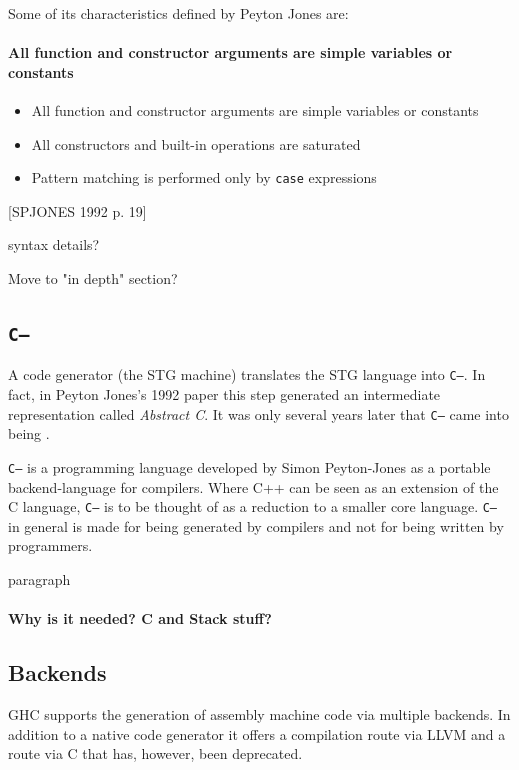 \documentclass[runningheads]{llncs}
\begin{document}
Some of its characteristics defined by Peyton Jones \cite{jones1992implementing} are:

\paragraph{All function and constructor arguments are simple variables or constants}
\begin{itemize}
	\item All function and constructor arguments are simple variables or constants
	\item All constructors and built-in operations are saturated
	\item Pattern matching is performed only by \texttt{case} expressions
\end{itemize}

[SPJONES 1992 p. 19]


syntax details?

Move to "in depth" section?

\subsection{\texttt{C--}}
\label{subsec:C--}

A code generator (the STG machine) translates the STG language into \texttt{C--}. In fact, in Peyton Jones's 1992 paper \cite{jones1992implementing} this step generated an intermediate representation called \textit{Abstract C}. It was only several years later that \texttt{C--} came into being \cite{jones1999c}.

\texttt{C--} is a programming language developed by Simon Peyton-Jones as a portable backend-language for compilers. Where C++ can be seen as an extension of the C language, \texttt{C--} is to be thought of as a reduction to a smaller core language. \texttt{C--} in general is made for being generated by compilers and not for being written by programmers. \cite{jones1999c}

paragraph



\paragraph{Why is it needed? C and Stack stuff?}


\subsection{Backends}
GHC supports the generation of assembly machine code via multiple backends. In addition to a native code generator it offers a compilation route via LLVM and a route via C that has, however, been deprecated.
\end{document}
